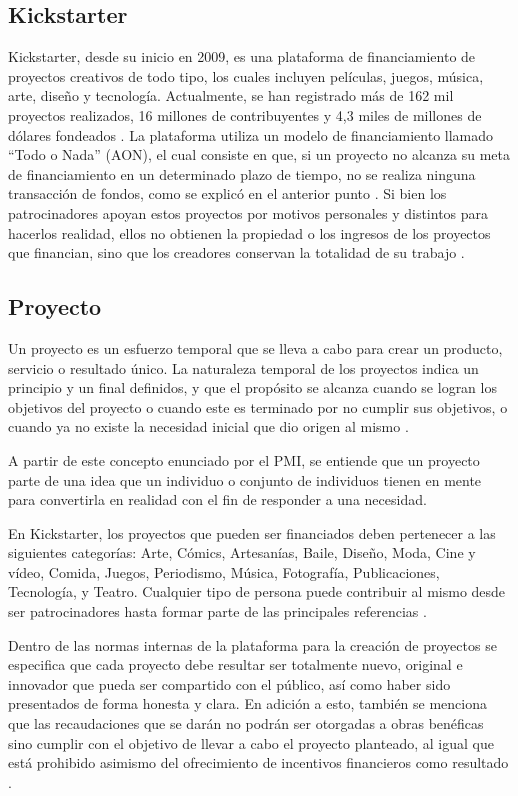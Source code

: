 \subsection{Kickstarter}
Kickstarter, desde su inicio en 2009, es una plataforma de financiamiento de proyectos creativos de todo tipo, los cuales incluyen películas, juegos, música, arte, diseño y tecnología. Actualmente, se han registrado más de 162 mil proyectos realizados, 16 millones de contribuyentes y 4,3 miles de millones de dólares fondeados \parencite{cr_kickstarter_about}. La plataforma utiliza un modelo de financiamiento llamado “Todo o Nada” (AON), el cual consiste en que, si un proyecto no alcanza su meta de financiamiento en un determinado plazo de tiempo, no se realiza ninguna transacción de fondos, como se explicó en el anterior punto \parencite{cr_kickstarter_founding}. Si bien los patrocinadores apoyan estos proyectos por motivos personales y distintos para hacerlos realidad, ellos no obtienen la propiedad o los ingresos de los proyectos que financian, sino que los creadores conservan la totalidad de su trabajo \parencite{cr_kickstarter_press}.

\subsection{Proyecto}
Un proyecto es un esfuerzo temporal que se lleva a cabo para crear un producto, servicio o resultado único. La naturaleza temporal de los proyectos indica un principio y un final definidos, y que el propósito se alcanza cuando se logran los objetivos del proyecto o cuando este es terminado por no cumplir sus objetivos, o cuando ya no existe la necesidad inicial que dio origen al mismo \parencite{bk_pmi2017pmbokguide}.

A partir de este concepto enunciado por el PMI, se entiende que un proyecto parte de una idea que un individuo o conjunto de individuos tienen en mente para convertirla en realidad con el fin de responder a una necesidad.

En Kickstarter, los proyectos que pueden ser financiados deben pertenecer a las siguientes categorías: Arte, Cómics, Artesanías, Baile, Diseño, Moda, Cine y vídeo, Comida, Juegos, Periodismo, Música, Fotografía, Publicaciones, Tecnología, y Teatro. Cualquier tipo de persona puede contribuir al mismo desde ser patrocinadores hasta formar parte de las principales referencias \parencite{cr_kickstarter_learn}.

Dentro de las normas internas de la plataforma para la creación de proyectos se especifica que cada proyecto debe resultar ser totalmente nuevo, original e innovador que pueda ser compartido con el público, así como haber sido presentados de forma honesta y clara. En adición a esto, también se menciona que las recaudaciones que se darán no podrán ser otorgadas a obras benéficas sino cumplir con el objetivo de llevar a cabo el proyecto planteado, al igual que está prohibido asimismo del ofrecimiento de incentivos financieros como resultado \parencite{cr_kickstarter_rules}.


